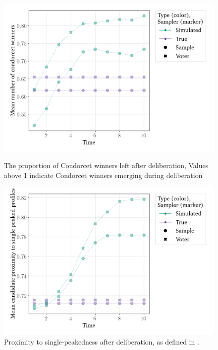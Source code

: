 \begin{figure}[htbp]
	\vspace{1em}

	\begin{minipage}{0.45\textwidth}
		\centering
		\includegraphics[width=\textwidth]{Figures/delib_Mean number of Condorcet winners.png}
		\caption{The proportion of Condorcet winners left after deliberation, Values above 1 indicate Condorcet winners emerging during deliberation}
		\label{fig:degroot_condorcet}
	\end{minipage}\hfill
	\begin{minipage}{0.45\textwidth}
		\centering
		\vspace{-9pt}
		\includegraphics[width=\textwidth]{Figures/delib_Mean candidate proximity to single peaked Profiles.png}
		\caption{Proximity to single-peakedness after deliberation, as defined in .}
		\label{fig:degroot_single_peaked}
	\end{minipage}
\end{figure}


